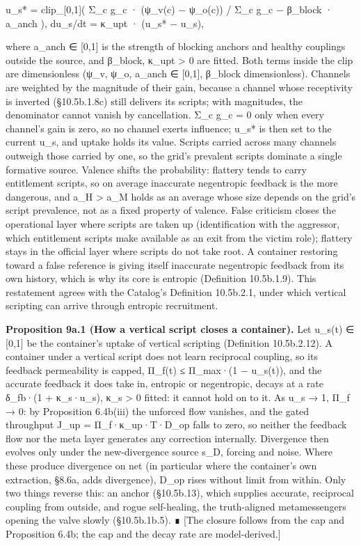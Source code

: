 \documentclass[
]{article}
\begin{document}
u\_s* = clip\_{[}0,1{]}( Σ\_c \textbar g\_c\textbar{} · (ψ\_v(c) −
ψ\_o(c)) / Σ\_c \textbar g\_c\textbar{} − β\_block · a\_anch ), du\_s/dt
= κ\_upt · (u\_s* − u\_s),

where a\_anch ∈ {[}0,1{]} is the strength of blocking anchors and
healthy couplings outside the source, and β\_block, κ\_upt
\textgreater{} 0 are fitted. Both terms inside the clip are
dimensionless (ψ\_v, ψ\_o, a\_anch ∈ {[}0,1{]}, β\_block dimensionless).
Channels are weighted by the magnitude of their gain, because a channel
whose receptivity is inverted (§10.5b.1.8c) still delivers its scripts;
with magnitudes, the denominator cannot vanish by cancellation. Σ\_c
\textbar g\_c\textbar{} = 0 only when every channel's gain is zero, so
no channel exerts influence; u\_s* is then set to the current u\_s, and
uptake holds its value. Scripts carried across many channels outweigh
those carried by one, so the grid's prevalent scripts dominate a single
formative source. Valence shifts the probability: flattery tends to
carry entitlement scripts, so on average inaccurate negentropic feedback
is the more dangerous, and a\_H \textgreater{} a\_M holds as an average
whose size depends on the grid's script prevalence, not as a fixed
property of valence. False criticism closes the operational layer where
scripts are taken up (identification with the aggressor, which
entitlement scripts make available as an exit from the victim role);
flattery stays in the official layer where scripts do not take root. A
container restoring toward a false reference is giving itself inaccurate
negentropic feedback from its own history, which is why its core is
entropic (Definition 10.5b.1.9). This restatement agrees with the
Catalog's Definition 10.5b.2.1, under which vertical scripting can
arrive through entropic recruitment.

\textbf{Proposition 9a.1 (How a vertical script closes a container).}
Let u\_s(t) ∈ {[}0,1{]} be the container's uptake of vertical scripting
(Definition 10.5b.2.12). A container under a vertical script does not
learn reciprocal coupling, so its feedback permeability is capped,
Π\_f(t) ≤ Π\_max·(1 − u\_s(t)), and the accurate feedback it does take
in, entropic or negentropic, decays at a rate δ\_fb·(1 + κ\_s·u\_s),
κ\_s \textgreater{} 0 fitted: it cannot hold on to it. As u\_s → 1, Π\_f
→ 0: by Proposition 6.4b(iii) the unforced flow vanishes, and the gated
throughput J\_up = Π\_f·κ\_up·T·D\_op falls to zero, so neither the
feedback flow nor the meta layer generates any correction internally.
Divergence then evolves only under the new-divergence source s\_D,
forcing and noise. Where these produce divergence on net (in particular
where the container's own extraction, §8.6a, adds divergence), D\_op
rises without limit from within. Only two things reverse this: an anchor
(§10.5b.13), which supplies accurate, reciprocal coupling from outside,
and rogue self-healing, the truth-aligned metamessengers opening the
valve slowly (§10.5b.1b.5). ∎ {[}The closure follows from the cap and
Proposition 6.4b; the cap and the decay rate are model-derived.{]}
\end{document}
